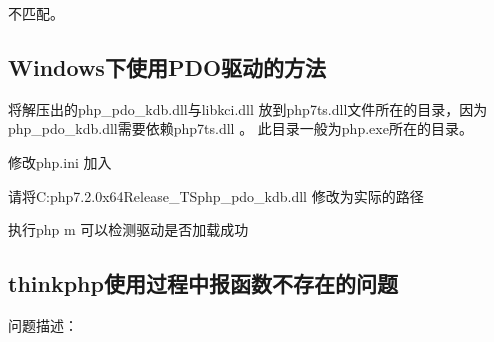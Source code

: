 \documentclass[a4,10pt,oneside,english]{sphinxmanual}
\begin{document}
不匹配。

\begin{sphinxVerbatim}[commandchars=\\\{\}]
     
     
     
     
     
     
\end{sphinxVerbatim}


\subsection{Windows下使用PDO驱动的方法}
\label{\detokenize{interface/pdo:windowspdo}}
将解压出的php\_pdo\_kdb.dll与libkci.dll 放到php7ts.dll文件所在的目录，因为php\_pdo\_kdb.dll需要依赖php7ts.dll 。  此目录一般为php.exe所在的目录。

\begin{figure}[H]
\centering

\noindent{}
\end{figure}

修改php.ini  加入

\begin{sphinxVerbatim}[commandchars=\\\{\}]
\PYGZbs{}\PYGZbs{}\PYGZbs{}\PYGZbs{}
\end{sphinxVerbatim}

请将C:php\sphinxhyphen{}7.2.0x64Release\_TSphp\_pdo\_kdb.dll 修改为实际的路径

执行php \sphinxhyphen{}m 可以检测驱动是否加载成功

\begin{figure}[H]
\centering

\noindent{}
\end{figure}


\subsection{thinkphp使用过程中报函数不存在的问题}
\label{\detokenize{interface/pdo:thinkphp}}
问题描述：
\end{document}
